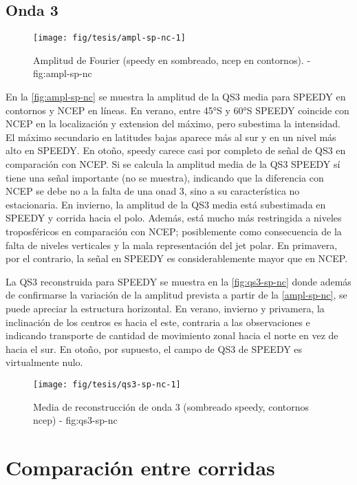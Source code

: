\documentclass[spanish,a4paper,12p]{book}
\begin{document}
\subsection{Onda 3}\label{onda-3-1}

\begin{figure*}
\texttt{[image: fig/tesis/ampl-sp-nc-1]} \caption{Amplitud de Fourier (speedy en sombreado, ncep en contornos). - fig:ampl-sp-nc}\label{fig:ampl-sp-nc}
\end{figure*}

En la \autoref{fig:ampl-sp-nc} se muestra la amplitud de la QS3 media
para SPEEDY en contornos y NCEP en líneas. En verano, entre 45°S y 60°S
SPEEDY coincide con NCEP en la localización y extension del máximo, pero
subestima la intensidad. El máximo secundario en latitudes bajas aparece
más al sur y en un nivel más alto en SPEEDY. En otoño, speedy carece
casi por completo de señal de QS3 en comparación con NCEP. Si se calcula
la amplitud media de la QS3 SPEEDY sí tiene una señal importante (no se
muestra), indicando que la diferencia con NCEP se debe no a la falta de
una onad 3, sino a su característica no estacionaria. En invierno, la
amplitud de la QS3 media está subestimada en SPEEDY y corrida hacia el
polo. Además, está mucho más restringida a niveles troposféricos en
comparación con NCEP; posiblemente como consecuencia de la falta de
niveles verticales y la mala representación del jet polar. En primavera,
por el contrario, la señal en SPEEDY es considerablemente mayor que en
NCEP.

La QS3 reconstruida para SPEEDY se muestra en la \autoref{fig:qs3-sp-nc}
donde además de confirmarse la variación de la amplitud prevista a
partir de la \autoref{ampl-sp-nc}, se puede apreciar la estructura
horizontal. En verano, invierno y privamera, la inclinación de los
centros es hacia el este, contraria a las observaciones e indicando
transporte de cantidad de movimiento zonal hacia el norte en vez de
hacia el sur. En otoño, por supuesto, el campo de QS3 de SPEEDY es
virtualmente nulo.

\begin{figure*}
\texttt{[image: fig/tesis/qs3-sp-nc-1]} \caption{Media de reconstrucción de onda 3 (sombreado speedy, contornos ncep) - fig:qs3-sp-nc}\label{fig:qs3-sp-nc}
\end{figure*}

\section{Comparación entre corridas}\label{comparacion-entre-corridas}
\end{document}
